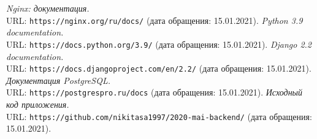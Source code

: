 \begin{thebibliography}{99}
{\itshape Nginx: документация.} \\URL: \texttt{https://nginx.org/ru/docs/} (дата обращения: 15.01.2021).
{\itshape Python 3.9 documentation.} \\URL: \texttt{https://docs.python.org/3.9/} (дата обращения: 15.01.2021).
{\itshape Django 2.2 documentation.} \\URL: \texttt{https://docs.djangoproject.com/en/2.2/} (дата обращения: 15.01.2021).
{\itshape Документация PostgreSQL.} \\URL: \texttt{https://postgrespro.ru/docs} (дата обращения: 15.01.2021).
{\itshape Исходный код приложения.} \\URL: \texttt{https://github.com/nikitasa1997/2020-mai-backend/} (дата обращения: 15.01.2021).
\end{thebibliography}
\pagebreak


